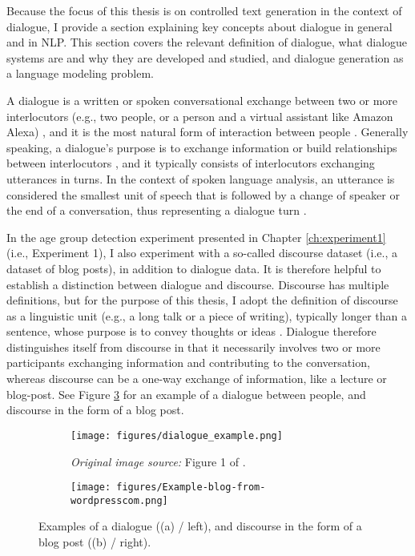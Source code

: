 Because the focus of this thesis is on controlled text generation in the context of dialogue, I provide a section explaining key concepts about dialogue in general and in NLP. This section covers the relevant definition of dialogue, what dialogue systems are and why they are developed and studied, and dialogue generation as a language modeling problem.

A dialogue is a written or spoken conversational exchange between two or more interlocutors (e.g., two people, or a person and a virtual assistant like Amazon Alexa) \citep{MerriamWebster2021Dialogue_Entry}, and it is the most natural form of interaction between people \citep{burtsev-etal-2018-deeppavlov}.
Generally speaking, a dialogue's purpose is to exchange information or build relationships between interlocutors \citep{bohm2013dialogue}, and it typically consists of interlocutors exchanging utterances in turns. In the context of spoken language analysis, an utterance is considered the smallest unit of speech that is followed by a change of speaker or the end of a conversation, thus representing a dialogue turn \citep{traum1996utterance}.

In the age group detection experiment presented in Chapter \ref{ch:experiment1} (i.e., Experiment 1), I also experiment with a so-called discourse dataset (i.e., a dataset of blog posts), in addition to dialogue data. It is therefore helpful to establish a distinction between dialogue and discourse. Discourse has multiple definitions, but for the purpose of this thesis, I adopt the definition of discourse as a linguistic unit (e.g., a long talk or a piece of writing), typically longer than a sentence, whose purpose is to convey thoughts or ideas \citep{MerriamWebster2021Dialogue_Entry}. Dialogue therefore distinguishes itself from discourse in that it necessarily involves two or more participants exchanging information and contributing to the conversation, whereas discourse can be a one-way exchange of information, like a lecture or blog-post. See Figure \ref{fig:examples_dialogue_blog_post} for an example of a dialogue between people, and discourse in the form of a blog post.


\begin{figure}[H]
     \centering
     \begin{subfigure}[b]{0.45\textwidth}
        \centering
        \texttt{[image: figures/dialogue\_example.png]}
        \caption{\textit{Original image source:} Figure 1 of \cite{liu-etal-2020-impress}.}
        \label{}
     \end{subfigure}
     \hfill
     \begin{subfigure}[b]{0.45\textwidth}
        \centering
        \texttt{[image: figures/Example-blog-from-wordpresscom.png]}
        \caption{}
        \label{}
     \end{subfigure}
        \caption{Examples of a dialogue ((a) / left), and discourse in the form of a blog post ((b) / right).}
        \label{fig:examples_dialogue_blog_post}
\end{figure}

